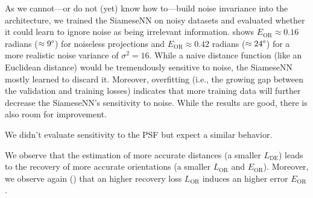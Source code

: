 As we cannot---or do not (yet) know how to---build noise invariance into the architecture, we trained the SiameseNN on noisy datasets and evaluated whether it could learn to ignore noise as being irrelevant information.
 shows $E_\text{OR} \approx 0.16$ radians ($\approx 9\degree$) for noiseless projections and $E_\text{OR} \approx 0.42$ radians ($\approx 24\degree$) for a more realistic noise variance of $\sigma^2=16$.
While a naive distance function (like an Euclidean distance) would be tremendously sensitive to noise, the SiameseNN mostly learned to discard it.
Moreover, overfitting (i.e., the growing gap between the validation and training losses) indicates that more training data will further decrease the SiameseNN's sensitivity to noise.
While the results are good, there is also room for improvement.

We didn't evaluate sensitivity to the PSF but expect a similar behavior.

We observe that the estimation of more accurate distances (a smaller $L_\text{DE}$) leads to the recovery of more accurate orientations (a smaller $L_\text{OR}$ and $E_\text{OR}$).
Moreover, we observe again () that an higher recovery loss $L_\text{OR}$ induces an higher error $E_\text{OR}$.


